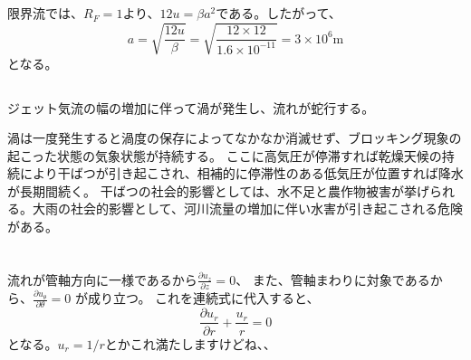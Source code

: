 \documentclass[a4paper]{jsarticle}
\begin{document}
\subsection{}
限界流では、$R_F = 1$より、$12 u = \beta a^2$である。したがって、
\begin{equation}
  a = \sqrt{\frac{12 u}{\beta}} = \sqrt{\frac{12 \times 12}{1.6 \times 10^{-11}}}
  = 3 \times 10^6 \mathrm{m}
\end{equation}
となる。

\subsection{}
ジェット気流の幅の増加に伴って渦が発生し、流れが蛇行する。\par
渦は一度発生すると渦度の保存によってなかなか消滅せず、ブロッキング現象の起こった状態の気象状態が持続する。
ここに高気圧が停滞すれば乾燥天候の持続により干ばつが引き起こされ、相補的に停滞性のある低気圧が位置すれば降水が長期間続く。
干ばつの社会的影響としては、水不足と農作物被害が挙げられる。大雨の社会的影響として、河川流量の増加に伴い水害が引き起こされる危険がある。

\section{}
\subsection{}
流れが管軸方向に一様であるから$\frac{\partial u_z}{\partial z} = 0$、
また、管軸まわりに対象であるから、$\frac{\partial u_{\theta}}{\partial \theta} = 0$
が成り立つ。
これを連続式に代入すると、
\begin{equation}
  \frac{\partial u_r}{\partial r} + \frac{u_r}{r} = 0
\end{equation}
となる。$u_r = 1/r$とかこれ満たしますけどね、、
\end{document}
